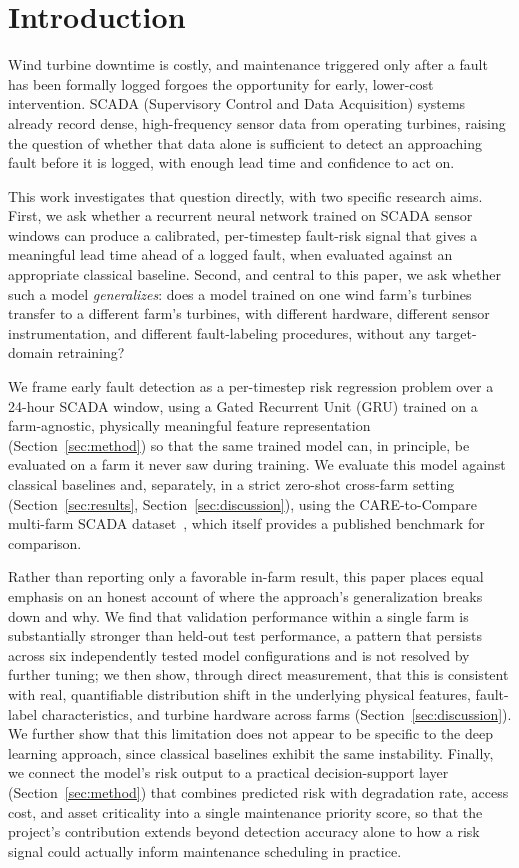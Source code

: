 \documentclass[conference]{IEEEtran}
\begin{document}
\section{Introduction}
Wind turbine downtime is costly, and maintenance triggered only after a
fault has been formally logged forgoes the opportunity for early,
lower-cost intervention. SCADA (Supervisory Control and Data Acquisition)
systems already record dense, high-frequency sensor data from operating
turbines, raising the question of whether that data alone is sufficient
to detect an approaching fault before it is logged, with enough lead time
and confidence to act on.
 
This work investigates that question directly, with two specific research
aims. First, we ask whether a recurrent neural network trained on
SCADA sensor windows can produce a calibrated, per-timestep fault-risk
signal that gives a meaningful lead time ahead of a logged fault, when
evaluated against an appropriate classical baseline. Second, and
central to this paper, we ask whether such a model \emph{generalizes}:
does a model trained on one wind farm's turbines transfer to a different
farm's turbines, with different hardware, different sensor
instrumentation, and different fault-labeling procedures, without any
target-domain retraining?
 
We frame early fault detection as a per-timestep risk regression problem
over a 24-hour SCADA window, using a Gated Recurrent Unit (GRU) trained
on a farm-agnostic, physically meaningful feature representation
(Section~\ref{sec:method}) so that the same trained model can, in
principle, be evaluated on a farm it never saw during training. We
evaluate this model against classical baselines and, separately, in a
strict zero-shot cross-farm setting (Section~\ref{sec:results},
Section~\ref{sec:discussion}), using the CARE-to-Compare multi-farm SCADA
dataset~\cite{gueck2024}, which itself provides a published benchmark for
comparison.
 
Rather than reporting only a favorable in-farm result, this paper places
equal emphasis on an honest account of where the approach's
generalization breaks down and why. We find that validation performance
within a single farm is substantially stronger than held-out test
performance, a pattern that persists across six independently tested
model configurations and is not resolved by further tuning; we then show,
through direct measurement, that this is consistent with real,
quantifiable distribution shift in the underlying physical features,
fault-label characteristics, and turbine hardware across farms
(Section~\ref{sec:discussion}). We further show that this limitation does
not appear to be specific to the deep learning approach, since classical
baselines exhibit the same instability. Finally, we connect the model's
risk output to a practical decision-support layer
(Section~\ref{sec:method}) that combines predicted risk with degradation
rate, access cost, and asset criticality into a single maintenance
priority score, so that the project's contribution extends beyond
detection accuracy alone to how a risk signal could actually inform
maintenance scheduling in practice.
 
\end{document}

